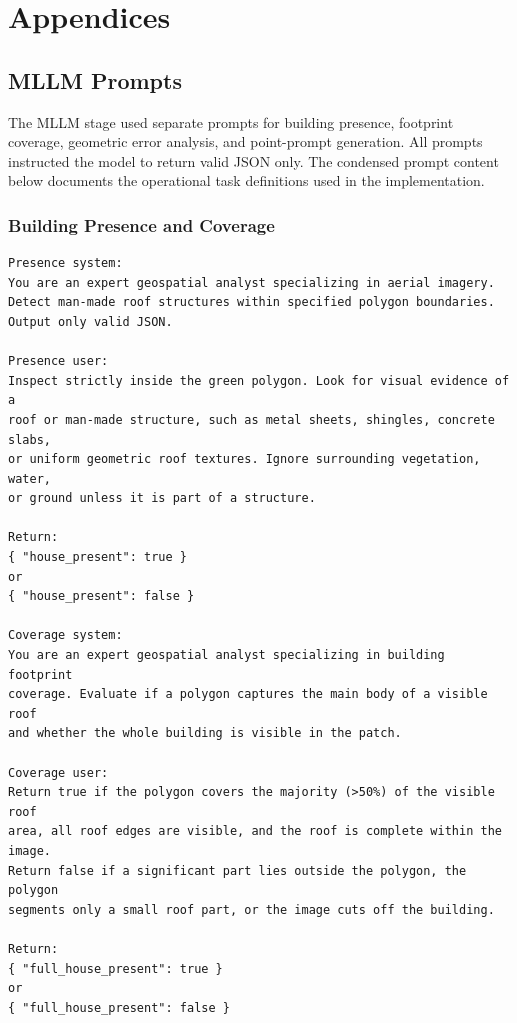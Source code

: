 \appendix
\chapter*{Appendices}\thispagestyle{rmplain}
\label{anhaenge}

\renewcommand{\thesection}{\Alph{section}}
\renewcommand{\thefigure}{\Alph{section}.\arabic{figure}}
\renewcommand{\thetable}{\Alph{section}.\arabic{table}}

\section{MLLM Prompts}\thispagestyle{rmplain}
\label{app:mllm_prompts}
\setcounter{figure}{0}
\setcounter{table}{0}

The MLLM stage used separate prompts for building presence, footprint coverage,
geometric error analysis, and point-prompt generation. All prompts instructed the
model to return valid JSON only. The condensed prompt content below documents the
operational task definitions used in the implementation.

\subsection*{Building Presence and Coverage}
\begin{lstlisting}[basicstyle=\ttfamily\small,breaklines=true]
Presence system:
You are an expert geospatial analyst specializing in aerial imagery.
Detect man-made roof structures within specified polygon boundaries.
Output only valid JSON.

Presence user:
Inspect strictly inside the green polygon. Look for visual evidence of a
roof or man-made structure, such as metal sheets, shingles, concrete slabs,
or uniform geometric roof textures. Ignore surrounding vegetation, water,
or ground unless it is part of a structure.

Return:
{ "house_present": true }
or
{ "house_present": false }

Coverage system:
You are an expert geospatial analyst specializing in building footprint
coverage. Evaluate if a polygon captures the main body of a visible roof
and whether the whole building is visible in the patch.

Coverage user:
Return true if the polygon covers the majority (>50%) of the visible roof
area, all roof edges are visible, and the roof is complete within the image.
Return false if a significant part lies outside the polygon, the polygon
segments only a small roof part, or the image cuts off the building.

Return:
{ "full_house_present": true }
or
{ "full_house_present": false }
\end{lstlisting}

